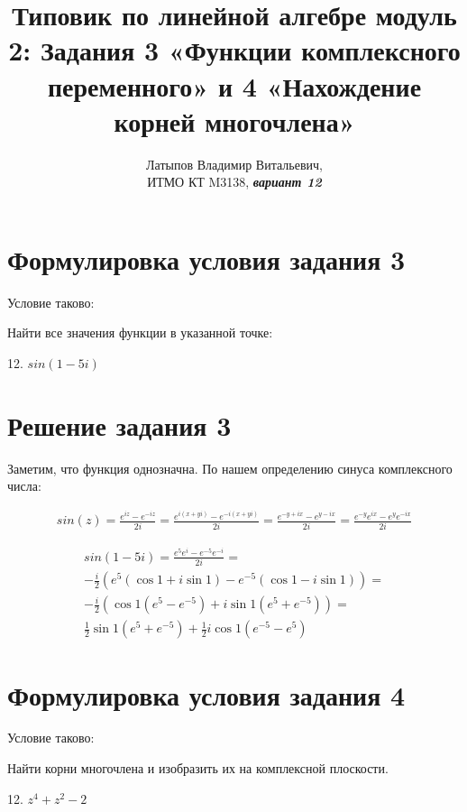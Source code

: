 \documentclass[12pt, a4paper]{article}
\author{Латыпов Владимир Витальевич, \\ ИТМО КТ M3138, \Huge{\textit{\textbf{вариант 12}}}}
\title{Типовик по линейной алгебре модуль 2: Задания 3 «Функции комплексного переменного» и 4 «Нахождение корней многочлена»}
\begin{document}
    \tit

    \section{Формулировка условия задания 3}

    \begin{statement}
        Условие таково: 
        
        Найти все значения функции в указанной точке:

        12. $sin (1 − 5i)$
    \end{statement}

    \section{Решение задания 3}

    Заметим, что функция однозначна.
    По нашем определению синуса комплексного числа:

    \begin{multline}
        sin(z) = \frac{e^{iz} - e^{-iz}}{2i} = 
        \frac{e^{i (x + yi)} - e^{-i (x + yi)}}{2i} = 
        \frac{e^{-y + ix} - e^{y - ix}}{2i} = 
        \frac{e^{-y} e^{ix} - e^{y} e^{-ix}}{2i}
    \end{multline}

    \begin{multline}
        sin(1 - 5i) = \frac{e^{5} e^{i} - e^{-5} e^{-i}}{2i} = \\
        -\frac{i}{2} \left( e^{5} (\cos 1 + i\sin 1) - e^{-5} (\cos 1 - i\sin 1) \right) = \\
        -\frac{i}{2} \left( \cos 1 (e^{5} - e^{-5}) + i\sin 1 (e^{5} + e^{-5}) \right) = \\
        \frac12 \sin 1 (e^{5} + e^{-5}) + \frac12 i \cos 1  (e^{-5} - e^{5})
    \end{multline}


    \section{Формулировка условия задания 4}

    \begin{statement}
        Условие таково: 
        
        Найти корни многочлена и изобразить их на комплексной плоскости.

        12. $z^4 + z^2 − 2$
    \end{statement}
\end{document}
